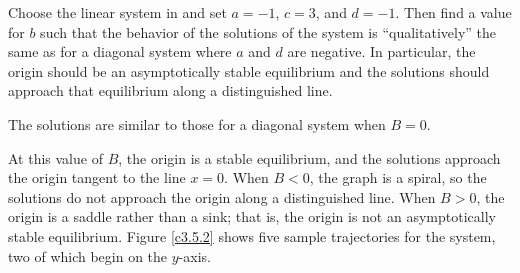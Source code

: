 \documentclass{ximera}
\begin{document}
\begin{computerExercise} \label{c3.5.2}
Choose the {\sf linear system} in {\pplane} and set
$a=-1$, $c=3$, and $d=-1$.
Then find a value for $b$ such that the behavior of the
solutions of the system is ``qualitatively'' the same as for a
diagonal system where $a$ and $d$ are negative.  In particular,
the origin should be an asymptotically stable equilibrium and
the solutions should approach that equilibrium along a
distinguished line.

\begin{solution}

\ans The solutions are similar to those for a diagonal system when
$B = 0$.

\soln At this value of $B$, the origin is a stable equilibrium, and the
solutions approach the origin tangent to the line $x = 0$.  When $B < 0$,
the graph is a spiral, so the solutions do not approach the origin along
a distinguished line.  When $B > 0$, the origin is a saddle rather
than a sink; that is, the origin is not an asymptotically stable
equilibrium.  Figure \ref{c3.5.2} shows five sample trajectories
for the system, two of which begin on the $y$-axis.

\begin{figure}[htb]
                       \centerline{%
                       }
\end{figure}

\end{solution}
\end{computerExercise}
\end{document}
